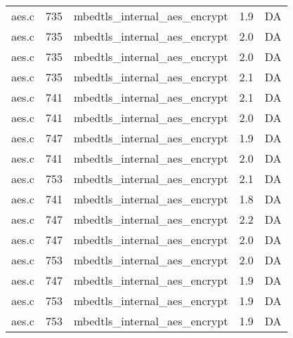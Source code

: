 \begin{table}[!ht]
\begin{tabular}{lrlrr}
aes.c& 735&mbedtls\_internal\_aes\_encrypt&1.9 &DA\\
aes.c& 735&mbedtls\_internal\_aes\_encrypt&2.0 &DA\\
aes.c& 735&mbedtls\_internal\_aes\_encrypt&2.0 &DA\\
aes.c& 735&mbedtls\_internal\_aes\_encrypt&2.1 &DA\\
aes.c& 741&mbedtls\_internal\_aes\_encrypt&2.1 &DA\\
aes.c& 741&mbedtls\_internal\_aes\_encrypt&2.0 &DA\\
aes.c& 747&mbedtls\_internal\_aes\_encrypt&1.9 &DA\\
aes.c& 741&mbedtls\_internal\_aes\_encrypt&2.0 &DA\\
aes.c& 753&mbedtls\_internal\_aes\_encrypt&2.1 &DA\\
aes.c& 741&mbedtls\_internal\_aes\_encrypt&1.8 &DA\\
aes.c& 747&mbedtls\_internal\_aes\_encrypt&2.2 &DA\\
aes.c& 747&mbedtls\_internal\_aes\_encrypt&2.0 &DA\\
aes.c& 753&mbedtls\_internal\_aes\_encrypt&2.0 &DA\\
aes.c& 747&mbedtls\_internal\_aes\_encrypt&1.9 &DA\\
aes.c& 753&mbedtls\_internal\_aes\_encrypt&1.9 &DA\\
aes.c& 753&mbedtls\_internal\_aes\_encrypt&1.9 &DA\\
\hline
\end{tabular}
\renewcommand{\baselinestretch}{1.0}\selectfont
\end{table}

